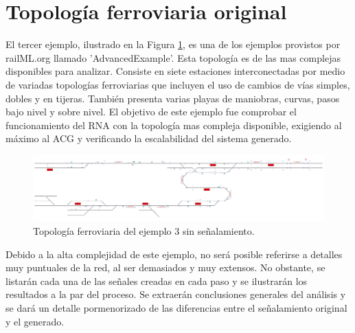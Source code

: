 \section{Topología ferroviaria original}

	El tercer ejemplo, ilustrado en la Figura \ref{fig:EJ3_1}, es una de los ejemplos provistos por railML.org llamado 'AdvancedExample'. Esta topología es de las mas complejas disponibles para analizar. Consiste en siete estaciones interconectadas por medio de variadas topologías ferroviarias que incluyen el uso de cambios de vías simples, dobles y en tijeras. También presenta varias playas de maniobras, curvas, pasos bajo nivel y sobre nivel. El objetivo de este ejemplo fue comprobar el funcionamiento del RNA con la topología mas compleja disponible, exigiendo al máximo al ACG y verificando la escalabilidad del sistema generado.
	
	\begin{figure}[H]
		\centering
		\includegraphics[width=1\textwidth]{resultados-obtenidos/ejemplo3/images/3_empty.png}
		\centering\caption{Topología ferroviaria del ejemplo 3 sin señalamiento.}
		\label{fig:EJ3_1}
	\end{figure}
	
	Debido a la alta complejidad de este ejemplo, no será posible referirse a detalles muy puntuales de la red, al ser demasiados y muy extensos. No obstante, se listarán cada una de las señales creadas en cada paso y se ilustrarán los resultados a la par del proceso. Se extraerán conclusiones generales del análisis y se dará un detalle pormenorizado de las diferencias entre el señalamiento original y el generado.
